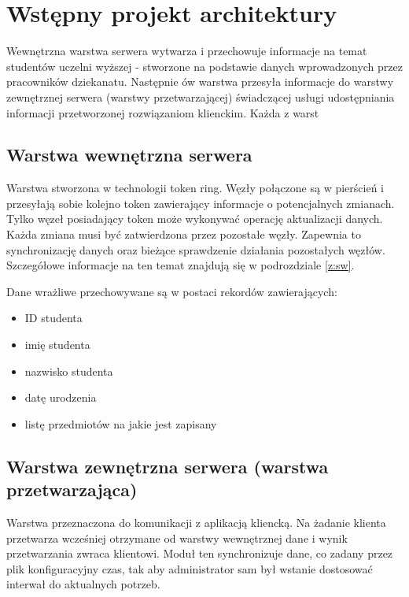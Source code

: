 \section[Wstępny projekt architektury]{Wstępny projekt architektury}

\par{Wewnętrzna warstwa serwera wytwarza i przechowuje informacje na temat studentów uczelni wyższej - stworzone na podstawie danych wprowadzonych przez pracowników dziekanatu. Następnie ów warstwa przesyła informacje do warstwy zewnętrznej serwera (warstwy przetwarzającej) świadczącej usługi udostępniania informacji przetworzonej rozwiązaniom klienckim. Każda z warst}

\subsection*[Warstwa wewnętrzna serwera]{Warstwa wewnętrzna serwera}

\par{Warstwa stworzona w technologii token ring. Węzły połączone są w pierścień i przesyłają sobie kolejno token zawierający informacje o potencjalnych zmianach. Tylko węzeł posiadający token może wykonywać operację aktualizacji danych. Każda zmiana musi być zatwierdzona przez pozostałe węzły. Zapewnia to synchronizację danych oraz bieżące sprawdzenie działania pozostałych węzłów. Szczegółowe informacje na ten temat znajdują się w podrozdziale \ref{z:sw}.}

\par{Dane wrażliwe przechowywane są w postaci rekordów zawierających:}

\begin{itemize}
\item ID studenta
\item imię studenta
\item nazwisko studenta
\item datę urodzenia
\item listę przedmiotów na jakie jest zapisany
\end{itemize}

\par{}

\subsection*[Warstwa zewnętrzna serwera]{Warstwa zewnętrzna serwera (warstwa przetwarzająca)}

\par{Warstwa przeznaczona do komunikacji z aplikacją kliencką. Na żadanie klienta przetwarza wcześniej otrzymane od warstwy wewnętrznej dane i wynik przetwarzania zwraca klientowi. Moduł ten synchronizuje dane, co zadany przez plik konfiguracyjny czas, tak aby administrator sam był wstanie dostosować interwał do aktualnych potrzeb. }

